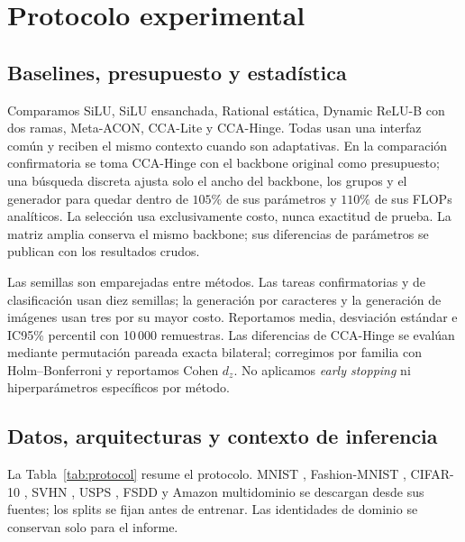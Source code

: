 \documentclass[runningheads]{llncs}
\begin{document}
\section{Protocolo experimental}

\subsection{Baselines, presupuesto y estadística}
Comparamos SiLU, SiLU ensanchada, Rational estática, Dynamic ReLU-B con dos ramas, Meta-ACON, CCA-Lite y CCA-Hinge. Todas usan una interfaz común y reciben el mismo contexto cuando son adaptativas. En la comparación confirmatoria se toma CCA-Hinge con el backbone original como presupuesto; una búsqueda discreta ajusta solo el ancho del backbone, los grupos y el generador para quedar dentro de $105\%$ de sus parámetros y $110\%$ de sus FLOPs analíticos. La selección usa exclusivamente costo, nunca exactitud de prueba. La matriz amplia conserva el mismo backbone; sus diferencias de parámetros se publican con los resultados crudos.

Las semillas son emparejadas entre métodos. Las tareas confirmatorias y de clasificación usan diez semillas; la generación por caracteres y la generación de imágenes usan tres por su mayor costo. Reportamos media, desviación estándar e IC95\% percentil con 10\,000 remuestras. Las diferencias de CCA-Hinge se evalúan mediante permutación pareada exacta bilateral; corregimos por familia con Holm--Bonferroni y reportamos Cohen $d_z$. No aplicamos \textit{early stopping} ni hiperparámetros específicos por método.

\subsection{Datos, arquitecturas y contexto de inferencia}
La Tabla~\ref{tab:protocol} resume el protocolo. MNIST \cite{lecun1998gradient}, Fashion-MNIST \cite{xiao2017fashion}, CIFAR-10 \cite{krizhevsky2009learning}, SVHN \cite{netzer2011reading}, USPS \cite{hull1994database}, FSDD \cite{jackson2018fsdd} y Amazon multidominio \cite{blitzer2007biographies} se descargan desde sus fuentes; los splits se fijan antes de entrenar. Las identidades de dominio se conservan solo para el informe.
\end{document}
